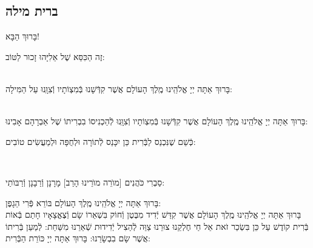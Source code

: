 \documentclass[twoside, openany, parskip=half, 11pt]{book}
\begin{document}
\begin{sometimes}
\vfill


\sepline



\chapter[ברית מילה]{ ברית מילה }

\begin{Large}
בָּרוּךְ הַבָּא!

\end{Large}

זֶה הַכִּסֵּא שֶׁל אֵלִיָּהוּ זָכוּר לַטּוֹב:


\\
בָּרוּךְ אַתָּה יְיָ אֱלֹהֵֽינוּ מֶֽלֶךְ הָעוֹלָם אֲשֶׁר קִדְּֿשָׁנוּ בְּֿמִצְוֹתָיו וְֿצִוָּֽנוּ עַל הַמִּילָה:

\\
בָּרוּךְ אַתָּה יְיָ אֱלֹהֵֽינוּ מֶֽלֶךְ הָעוֹלָם אֲשֶׁר קִדְּֿשָׁנוּ בְּֿמִצְוֹתָיו וְֿצִוָּֽנוּ לְֿהַכְנִיסוֹ בִבְרִיתוֹ שֶׁל אַבְרָהָם אָבִינוּ:

\kahal
כְּֿשֵׁם שֶׁנִּכְנַס לַבְּֿרִית כֵּן יִכָּנֵס לְֿתוֹרָה וּלְחֻפָּה וּלְמַעֲשִׂים טוֹבִים:

\\
\begin{footnotesize}
סַבְרִי כֹּהֲנִים [מוׂרֵה מוׂרֵינוּ הָרַב] מָרָנָן וְֿרַבָנָן וְֿרַבּוׂתַי:\\
\end{footnotesize}
בָּרוּךְ אַתָּה יְיָ אֱלֹהֵֽינוּ מֶֽלֶךְ הָעוֹלָם בּוֹרֵא פְּֿרִי הַגָפֶן:\\
בָּרוּךְ אַתָּה יְיָ אֱלֹהֵֽינוּ מֶֽלֶךְ הָעוֹלָם אֲשֶׁר קִדַּשׁ יְֿדִיד מִבֶּטֶן וְֿחוֹק בִּשְׁאֵרוֹ שָׂם וְֿצֶאֱצָאָיו חָתַם בְּֿאוֹת בְּֿרִית קוֹדֶשׁ עַל כֵּן בִּשְׂכַר זֹאת אֵל חַי חֶלְקֵנוּ צוּרֵנוּ צַוֵּה לְֿהַצִיל יְֿדִידוּת שְֿׁאֵרֵנוּ מִשַּׁחַת: לְֿמַעַן בְּֿרִיתוֹ אֲשֶׁר שָׂם בִבְשָׂרֵנוּ: בָּרוּךְ אַתָּה יְיָ כּוֹרֵת הַבְּֿרִית:


\end{sometimes}
\end{document}
